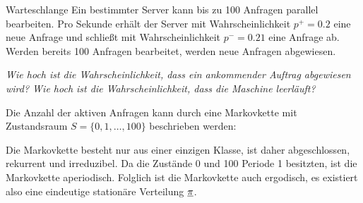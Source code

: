 \begin{example}{Warteschlange}{}
Ein bestimmter Server kann bis zu 100 Anfragen parallel bearbeiten. Pro Sekunde
erhält der Server mit Wahrscheinlichkeit $p^+ = 0.2$ eine neue Anfrage und schließt
mit Wahrscheinlichkeit $p^-=0.21$ eine Anfrage ab. Werden bereits 100 Anfragen
bearbeitet, werden neue Anfragen abgewiesen.

\emph{Wie hoch ist die Wahrscheinlichkeit, dass ein ankommender Auftrag abgewiesen
wird? Wie hoch ist die Wahrscheinlichkeit, dass die Maschine leerläuft?}

Die Anzahl der aktiven Anfragen kann durch eine Markovkette mit Zustandsraum
$S=\{0, 1,\ldots, 100\}$ beschrieben werden:

\medskip
{}

Die Markovkette besteht nur aus einer einzigen Klasse, ist daher abgeschlossen,
rekurrent und irreduzibel. Da die Zustände 0 und 100 Periode 1 besitzten, ist
die Markovkette aperiodisch. Folglich ist die Markovkette auch ergodisch, es
existiert also eine eindeutige stationäre Verteilung $\underline{\pi}$.


\end{example}
